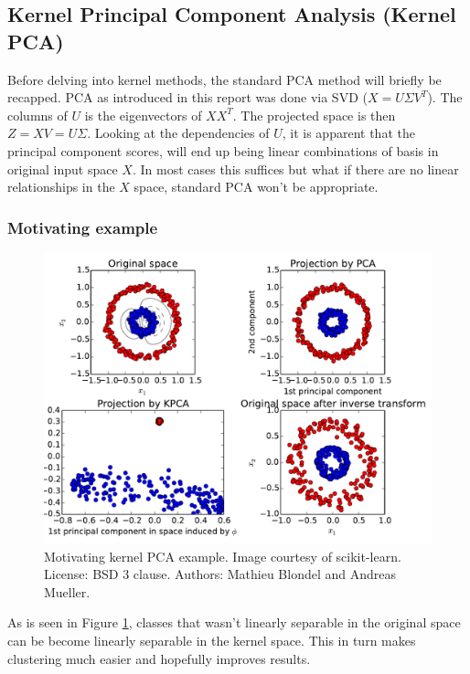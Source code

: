 \subsection{Kernel Principal Component Analysis (Kernel PCA)}

Before delving into kernel methods, the standard PCA method will briefly be recapped.
PCA as introduced in this report was done via SVD ($X = U\Sigma V^T$). The columns of $U$ is the eigenvectors of $XX^T$. The projected space is then $Z = XV = U\Sigma$. 
Looking at the dependencies of $U$, it is apparent that the principal component scores, will end up being linear combinations of basis in original input space $X$. 
In most cases this suffices but what if there are no linear relationships in the $X$ space, standard PCA won't be appropriate.

\subsubsection{Motivating example}
\begin{figure}[H]
	\center
	\includegraphics[width=\textwidth]{figures/kernel-pca-example}
	\caption{Motivating kernel PCA example. Image courtesy of scikit-learn. License: BSD 3 clause. Authors: Mathieu Blondel and Andreas Mueller.}
	\label{fig:kernel-pca-example}
\end{figure}

As is seen in Figure \ref{fig:kernel-pca-example}, classes that wasn't linearly separable in the original space can be become linearly separable in the kernel space. This in turn makes clustering much easier and hopefully improves results.

